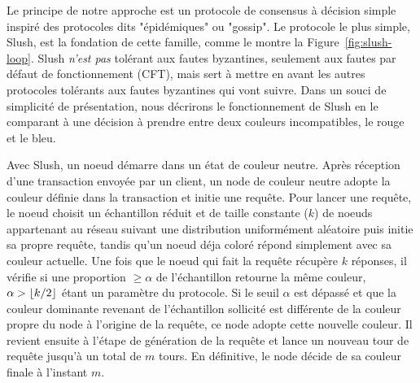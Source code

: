 \documentclass[letterpaper,twocolumn,10pt]{article}
\DeclarePairedDelimiter{\floor}{\lfloor}{\rfloor}
\theoremstyle{definition}
\begin{document}
Le principe de notre approche est un protocole de consensus à décision simple inspiré des protocoles dits "épidémiques"
ou "gossip". Le protocole le plus simple, Slush, est la fondation de cette famille, comme le montre la
Figure~\ref{fig:slush-loop}. Slush \emph{n'est pas} tolérant aux fautes byzantines, seulement aux fautes par défaut
de fonctionnement (CFT), mais sert à mettre en avant les autres protocoles tolérants aux fautes byzantines qui vont
suivre. Dans un souci de simplicité de présentation, nous décrirons le fonctionnement de Slush en le comparant
à une décision à prendre entre deux couleurs incompatibles, le rouge et le bleu.


Avec Slush, un noeud démarre dans un état de couleur neutre. Après réception d'une transaction envoyée par un client,
un node de couleur neutre adopte la couleur définie dans la transaction et initie une requête. Pour lancer une
requête, le noeud choisit un échantillon réduit et de taille constante ($k$) de noeuds appartenant au réseau suivant
une distribution uniformément aléatoire puis initie sa propre requête, tandis qu'un noeud déja coloré répond
simplement avec sa couleur actuelle. Une fois que le noeud qui fait la requête récupère $k$ réponses, il vérifie si
une proportion $\ge\alpha$ de l'échantillon retourne la même couleur, $\alpha > \floor{k/2}$ étant un paramètre
du protocole. Si le seuil $\alpha$ est dépassé et que la couleur dominante revenant de l'échantillon sollicité est
différente de la couleur propre du node à l'origine de la requête, ce node adopte cette nouvelle couleur. Il revient
ensuite à l'étape de génération de la requête et lance un nouveau tour de requête jusqu'à un total de $m$ tours.
En définitive, le node décide de sa couleur finale à l'instant $m$.
\end{document}
